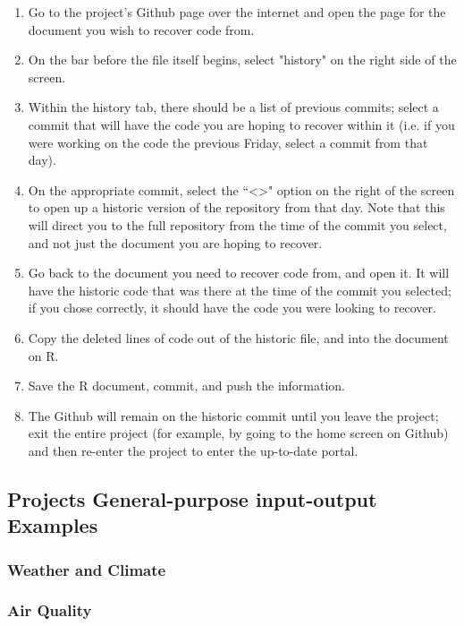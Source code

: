 \documentclass{article}\usepackage[]{graphicx}\usepackage[]{color}
\begin{document}
\begin{enumerate}

\item Go to the project's Github page over the internet and open the page for the document you wish to recover code from.
\item On the bar before the file itself begins, select "history" on the right side of the screen.
\item Within the history tab, there should be a list of previous commits; select a commit that will have the code you are hoping to recover within it (i.e. if you were working on the code the previous Friday, select a commit from that day).
\item On the appropriate commit, select the ``<>" option on the right of the screen to open up a historic version of the repository from that day.  Note that this will direct you to the full repository from the time of the commit you select, and not just the document you are hoping to recover.
\item Go back to the document you need to recover code from, and open it.  It will have the historic code that was there at the time of the commit you selected; if you chose correctly, it should have the code you were looking to recover.
\item Copy the deleted lines of code out of the historic file, and into the document on R.  
\item Save the R document, commit, and push the information.  
\item The Github will remain on the historic commit until you leave the project; exit the entire project (for example, by going to the home screen on Github) and then re-enter the project to enter the up-to-date portal.

\end{enumerate}

\subsection{Projects General-purpose input-output Examples}

\subsubsection{Weather and Climate}


\subsubsection{Air Quality}
\end{document}
